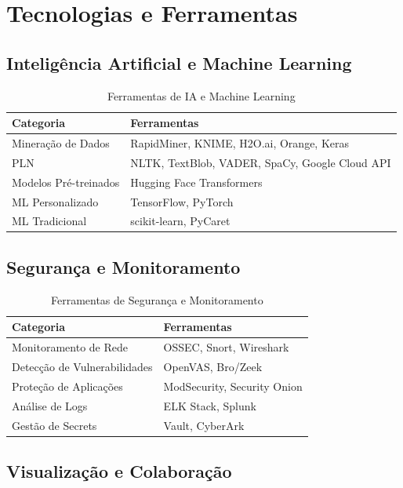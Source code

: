 \documentclass[12pt,a4paper]{article}
\begin{document}
\section{Tecnologias e Ferramentas}

\subsection{Inteligência Artificial e Machine Learning}

\begin{table}[h]
\centering
\small
\begin{tabular}{@{}lp{10cm}@{}}
\toprule
\textbf{Categoria} & \textbf{Ferramentas} \\
\midrule
Mineração de Dados & RapidMiner, KNIME, H2O.ai, Orange, Keras \\
PLN & NLTK, TextBlob, VADER, SpaCy, Google Cloud API \\
Modelos Pré-treinados & Hugging Face Transformers \\
ML Personalizado & TensorFlow, PyTorch \\
ML Tradicional & scikit-learn, PyCaret \\
\bottomrule
\end{tabular}
\caption{Ferramentas de IA e Machine Learning}
\end{table}

\subsection{Segurança e Monitoramento}

\begin{table}[h]
\centering
\small
\begin{tabular}{@{}lp{10cm}@{}}
\toprule
\textbf{Categoria} & \textbf{Ferramentas} \\
\midrule
Monitoramento de Rede & OSSEC, Snort, Wireshark \\
Detecção de Vulnerabilidades & OpenVAS, Bro/Zeek \\
Proteção de Aplicações & ModSecurity, Security Onion \\
Análise de Logs & ELK Stack, Splunk \\
Gestão de Secrets & Vault, CyberArk \\
\bottomrule
\end{tabular}
\caption{Ferramentas de Segurança e Monitoramento}
\end{table}

\subsection{Visualização e Colaboração}
\end{document}
